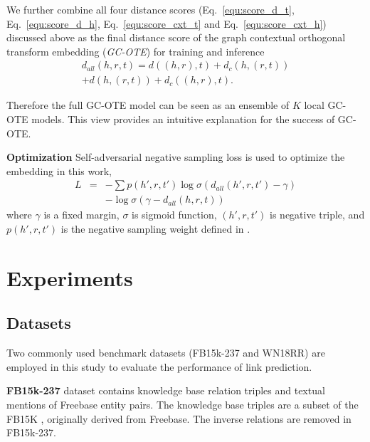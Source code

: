 \documentclass[11pt,a4paper]{article}
\begin{document}
We further combine all four distance scores (Eq.~\ref{equ:score_d_t}, Eq.~\ref{equ:score_d_h}, Eq.~\ref{equ:score_cxt_t} and Eq.~\ref{equ:score_cxt_h}) discussed above as the final distance score of the graph contextual orthogonal transform embedding ({\it  GC-OTE}) for training and inference
\begin{eqnarray}
    d_{all}(h,r,t) = d((h,r),t) + d_c(h,(r,t)) \nonumber\\
    + d(h,(r,t)) + d_c((h,r),t). \label{equ:score_d_all}
\end{eqnarray}

Therefore the full GC-OTE model can be seen as an ensemble of $K$ local GC-OTE models. This view provides an intuitive explanation for the success of GC-OTE.

\noindent\textbf{Optimization} Self-adversarial negative sampling loss \cite{Sun2019RotatEKG} is used to optimize the embedding in this work, 
\begin{eqnarray}
    L &=&  -\sum p(h',r,t')\log\sigma(d_{all}(h',r,t') - \gamma) \nonumber\\
     && -\log\sigma(\gamma - d_{all}(h,r,t))
\end{eqnarray}
where $\gamma$ is a fixed margin, $\sigma$ is sigmoid function, $(h',r,t')$ is negative 
triple, and $p(h',r,t')$ is the negative sampling weight defined in \cite{Sun2019RotatEKG}.














\section{Experiments}\label{sec:exp}

\subsection{Datasets}
Two commonly used benchmark datasets (FB15k-237 and WN18RR) are employed in this study to evaluate the performance of link prediction.

\noindent\textbf{FB15k-237} \cite{toutanova2015observed} dataset contains knowledge base relation triples and textual mentions of Freebase entity pairs. The knowledge base triples are a subset of the FB15K \cite{bordes2013translating}, originally derived from Freebase. The inverse relations are removed in FB15k-237.
\end{document}
